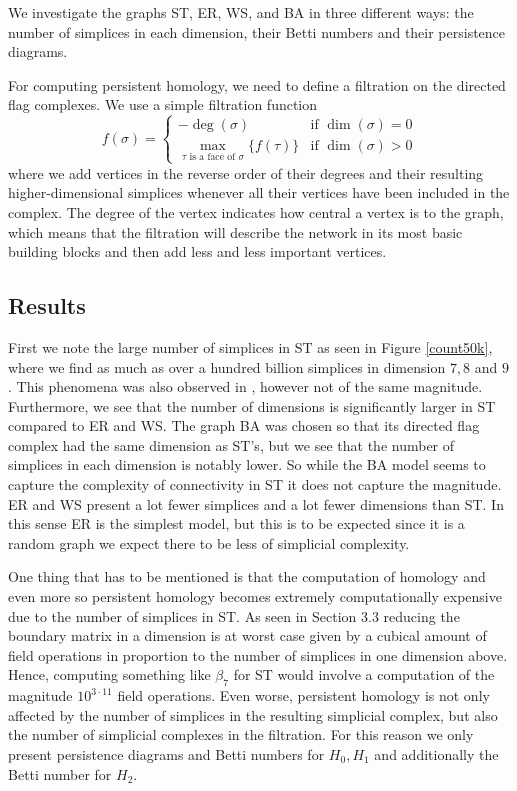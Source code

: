 We investigate the graphs ST, ER, WS, and BA in three different ways: the number of simplices in each dimension, their Betti numbers and their persistence diagrams.

For computing persistent homology, we need to define a filtration on the directed flag complexes.
We use a simple filtration function
\[
  f(\sigma) = \begin{cases}
    -\deg(\sigma) & \text{if } \dim(\sigma) = 0 \\
    \max_{\tau \text{ is a face of } \sigma} \{ f(\tau) \} & \text{if } \dim(\sigma) > 0
  \end{cases}
\] where we add vertices in the reverse order of their degrees and their resulting higher-dimensional simplices whenever all their vertices have been included in the complex. The degree of the vertex indicates how central a vertex is to the graph, which means that the filtration will describe the network in its most basic building blocks and then add less and less important vertices.
\subsection{Results}
First we note the large number of simplices in ST as seen in Figure \ref{count50k}, where we find as much as over a hundred billion simplices in dimension $7,8$ and $9$. This phenomena was also observed in \cite{reimann}, however not of the same magnitude.  Furthermore, we see that the number of dimensions is significantly larger in ST compared to ER and WS. The graph BA was chosen so that its directed flag complex had the same dimension as ST's, but we see that the number of simplices in each dimension is notably lower. So while the BA model seems to capture the complexity of connectivity in ST it does not capture the magnitude. ER and WS present a lot fewer simplices and a lot fewer dimensions than ST. In this sense ER is the simplest model, but this is to be expected since it is a random graph we expect there to be less of simplicial complexity.

One thing that has to be mentioned is that the computation of homology and even more so persistent homology becomes extremely computationally expensive due to the number of simplices in ST. As seen in Section 3.3 reducing the boundary matrix in a dimension is at worst case given by a cubical amount of field operations in proportion to the number of simplices in one dimension above. Hence, computing something like $\beta_{7}$ for ST would involve a computation of the magnitude $10^{3 \cdot 11}$ field operations. Even worse, persistent homology is not only affected by the number of simplices in the resulting simplicial complex, but also the number of simplicial complexes in the filtration. For this reason we only present persistence diagrams and Betti numbers for $H_{0},H_{1}$ and additionally the Betti number for $H_{2}$.

